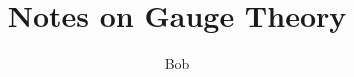 \documentclass[12pt,a4paper]{article}
\newlength{\tocupshift}
\begin{document}
\title{Notes on Gauge Theory}
\author{Bob}
\date{}
\maketitle
\vspace*{\tocupshift}
\tableofcontents


% 
% 
% 
% 

% 
\end{document}
